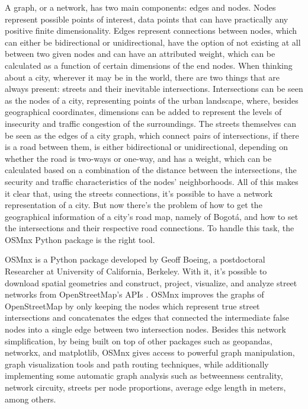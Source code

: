 \documentclass[runningheads]{llncs}
\begin{document}
A graph, or a network, has two main components: edges and nodes. Nodes represent possible points of interest, data points that can have practically any positive finite dimensionality. Edges represent connections between nodes, which can either be bidirectional or unidirectional, have the option of not existing at all between two given nodes and can have an attributed weight, which can be calculated as a function of certain dimensions of the end nodes. 
When thinking about a city, wherever it may be in the world, there are two things that are always present: streets and their inevitable intersections. Intersections can be seen as the nodes of a city, representing points of the urban landscape, where, besides geographical coordinates, dimensions can be added to represent the levels of insecurity and traffic congestion of the surroundings. The streets themselves can be seen as the edges of a city graph, which connect pairs of intersections, if there is a road between them, is either bidirectional or unidirectional, depending on whether the road is two-ways or one-way, and has a weight, which can be calculated based on a combination of the distance between the intersections, the security and traffic characteristics of the nodes' neighborhoods. All of this makes it clear that, using the streets connections, it's possible to have a network representation of a city. But now there's the problem of how to get the geographical information of a city's road map, namely of Bogotá, and how to set the intersections and their respective road connections. To handle this task, the OSMnx \cite{geoff_osmnx:_2017} Python package is the right tool.

OSMnx \cite{geoff_osmnx:_2017} is a Python package developed by Geoff Boeing, a postdoctoral Researcher at University of California, Berkeley. With it, it's possible to download spatial geometries and construct, project, visualize, and analyze street networks from OpenStreetMap’s APIs \cite{noauthor_open_nodate}. OSMnx \cite{geoff_osmnx:_2017} improves the graphs of OpenStreetMap by only keeping the nodes which represent true street intersections and concatenates the edges that connected the intermediate false nodes into a single edge between two intersection nodes. Besides this network simplification, by being built on top of other packages such as geopandas, networkx, and matplotlib, OSMnx \cite{geoff_osmnx:_2017} gives access to powerful graph manipulation, graph visualization tools and path routing techniques, while additionally implementing some automatic graph analysis such as betweenness centrality, network circuity, streets per node proportions, average edge length in meters, among others.
\end{document}
